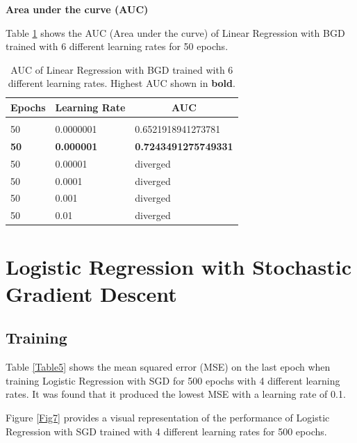 \documentclass{article} %
\begin{document}
\textbf{Area under the curve (AUC)}

Table \ref{Table4} shows the AUC (Area under the curve) of Linear Regression with BGD trained with 6 different learning rates for 50 epochs.

\begin{table}[!htbp]
\caption{AUC of Linear Regression with BGD trained with 6 different learning rates. Highest AUC shown in \textbf{bold}.}
\label{Table4}
\begin{center}
\begin{tabular}{l l l}
\multicolumn{1}{c}{\bf Epochs} &\multicolumn{1}{c}{\bf Learning Rate} &\multicolumn{1}{c}{\bf AUC}
\\ \hline \\

50 & 0.0000001 & 0.6521918941273781\\

\textbf{50} & \textbf{0.000001}  & \textbf{0.7243491275749331}\\

50 & 0.00001   & diverged\\
50 & 0.0001    & diverged\\
50 & 0.001     & diverged\\
50 & 0.01      & diverged\\
\end{tabular}
\end{center}
\end{table}

\section{Logistic Regression with Stochastic Gradient Descent \cite{ng2000cs229} \cite{roc_curve}}

\subsection{Training}

Table \ref{Table5} shows the mean squared error (MSE) on the last epoch when training Logistic Regression with SGD for 500 epochs with 4 different learning rates. It was found that it produced the lowest MSE with a learning rate of 0.1.

Figure \ref{Fig7} provides a visual representation of the performance of Logistic Regression with SGD trained with 4 different learning rates for 500 epochs.
\end{document}
